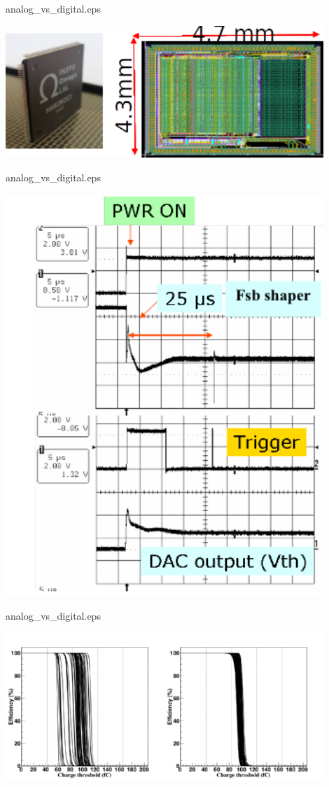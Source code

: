 \begin{frame}{analog\_vs\_digital.eps}
  \centerline{\includegraphics[width=0.9\textwidth]{images/HR2Chip}}
\end{frame}
\begin{frame}{analog\_vs\_digital.eps}
  \centerline{\includegraphics[width=0.9\textwidth]{images/PowerPulsingTiming}}
\end{frame}
\begin{frame}{analog\_vs\_digital.eps}
  \centerline{\includegraphics[width=0.9\textwidth]{images/HR2GainAdjustement}}
\end{frame}
